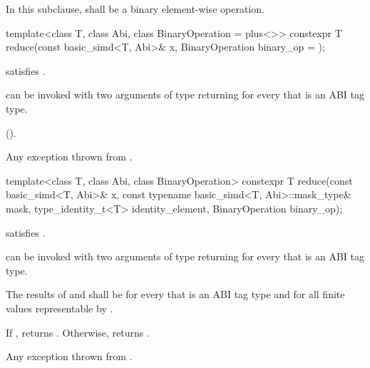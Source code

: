 \pnum
In this subclause,  shall be a binary element-wise operation.

\begin{itemdecl}
template<class T, class Abi, class BinaryOperation = plus<>>
  constexpr T reduce(const basic_simd<T, Abi>& x, BinaryOperation binary_op = {});
\end{itemdecl}

\begin{itemdescr}
  \pnum\constraints
   satisfies .

  \pnum\mandates
   can be invoked with two arguments of type
   returning  for every
   that is an ABI tag type.

  \pnum\returns
   \foralli ().

  \pnum\throws
  Any exception thrown from .
\end{itemdescr}

\begin{itemdecl}
template<class T, class Abi, class BinaryOperation>
  constexpr T reduce(const basic_simd<T, Abi>& x, const typename basic_simd<T, Abi>::mask_type& mask,
                     type_identity_t<T> identity_element, BinaryOperation binary_op);
\end{itemdecl}

\begin{itemdescr}
  \pnum\constraints
   satisfies .

  \pnum\mandates
   can be invoked with two arguments of type  returning  for every  that is an ABI tag type.

  \pnum\expects
  The results of  and  shall be  for every  that is an ABI tag type and for all finite values  representable by .

  \pnum\returns
  If , returns .
  Otherwise, returns  \forallmaskedi.

  \pnum\throws
  Any exception thrown from .
\end{itemdescr}

